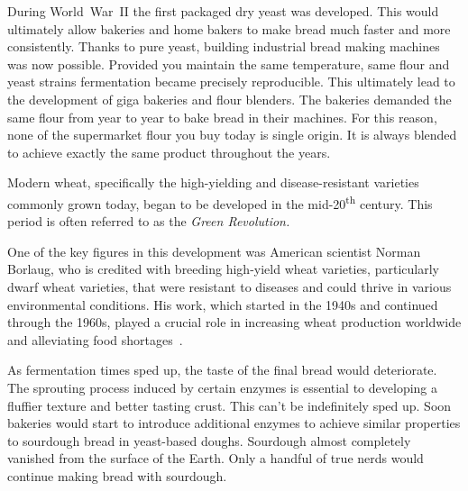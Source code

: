During World~War~II the first packaged dry yeast was developed. This would
ultimately allow bakeries and home bakers to make bread much faster and more
consistently. Thanks to pure yeast, building industrial bread making machines
was now possible. Provided you maintain the same temperature, same flour and
yeast strains fermentation became precisely reproducible. This ultimately lead
to the development of giga bakeries and flour blenders. The bakeries demanded
the same flour from year to year to bake bread in their machines.  For this
reason, none of the supermarket flour you buy today is single origin.  It is
always blended to achieve exactly the same product throughout the years.

Modern wheat, specifically the high-yielding and disease-resistant varieties
commonly grown today, began to be developed in the mid-20\textsuperscript{th}
century. This period is often referred to as the \emph{Green Revolution.}

One of the key figures in this development was American scientist Norman
Borlaug, who is credited with breeding high-yield wheat varieties,
particularly dwarf wheat varieties, that were resistant to diseases and could
thrive in various environmental conditions. His work, which started in the
1940s and continued through the \num{1960}s, played a crucial role in
increasing wheat production worldwide and alleviating food
shortages~\cite{green+revolution}.

As fermentation
times sped up, the taste of the final bread would deteriorate.
The sprouting process induced by certain enzymes is essential
to developing a fluffier texture and better tasting crust. This
can't be indefinitely sped up. Soon bakeries would start
to introduce additional enzymes to achieve similar properties
to sourdough bread in yeast-based doughs. Sourdough almost completely
vanished from the surface of the Earth. Only a handful
of true nerds would continue making bread with sourdough.

